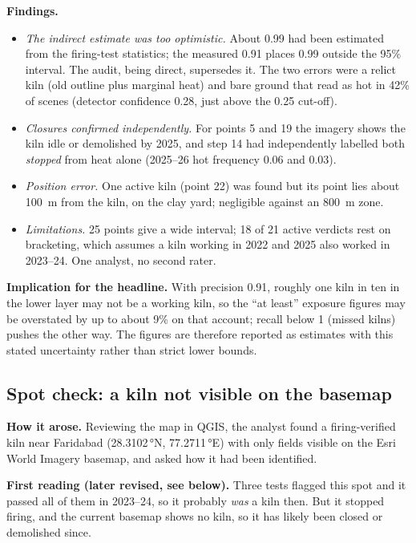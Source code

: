 \documentclass[11pt,a4paper]{article}
\begin{document}
\textbf{Findings.}
\begin{itemize}[leftmargin=*]
\item \emph{The indirect estimate was too optimistic.} About 0.99 had been
estimated from the firing-test statistics; the measured 0.91 places 0.99 outside
the 95\% interval. The audit, being direct, supersedes it. The two errors were a
relict kiln (old outline plus marginal heat) and bare ground that read as hot in
42\% of scenes (detector confidence 0.28, just above the 0.25 cut-off).
\item \emph{Closures confirmed independently.} For points 5 and 19 the imagery
shows the kiln idle or demolished by 2025, and step 14 had independently labelled
both \emph{stopped} from heat alone (2025--26 hot frequency 0.06 and 0.03).
\item \emph{Position error.} One active kiln (point 22) was found but its point
lies about 100~m from the kiln, on the clay yard; negligible against an 800~m
zone.
\item \emph{Limitations.} 25 points give a wide interval; 18 of 21 active
verdicts rest on bracketing, which assumes a kiln working in 2022 and 2025 also
worked in 2023--24. One analyst, no second rater.
\end{itemize}
\textbf{Implication for the headline.} With precision 0.91, roughly one kiln in
ten in the lower layer may not be a working kiln, so the ``at least'' exposure
figures may be overstated by up to about 9\% on that account; recall below 1
(missed kilns) pushes the other way. The figures are therefore reported as
estimates with this stated uncertainty rather than strict lower bounds.

\subsection{Spot check: a kiln not visible on the basemap}
\textbf{How it arose.} Reviewing the map in QGIS, the analyst found a
firing-verified kiln near Faridabad (28.3102\,°N, 77.2711\,°E) with only fields
visible on the Esri World Imagery basemap, and asked how it had been identified.

\textbf{First reading (later revised, see below).} Three tests flagged this
spot and it passed all of them in 2023--24, so it probably \emph{was} a kiln
then. But it stopped firing, and the current basemap shows no kiln, so it has
likely been closed or demolished since.
\end{document}
